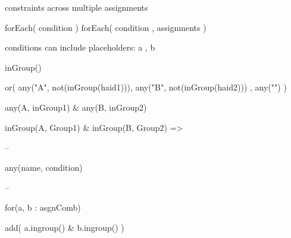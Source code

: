 constraints across multiple assignments

forEach( condition )
forEach( condition , assignments )



conditions can include placeholders: a , b

inGroup()

or( any("A", not(inGroup(haid1))), any("B", not(inGroup(haid2))) , any("") )


any(A, inGroup1) & any(B, inGroup2)

inGroup(A, Group1) & inGroup(B, Group2) => 

--

any(name, condition)


--

for(a, b : asgnComb)

  add( a.ingroup() & b.ingroup() )
